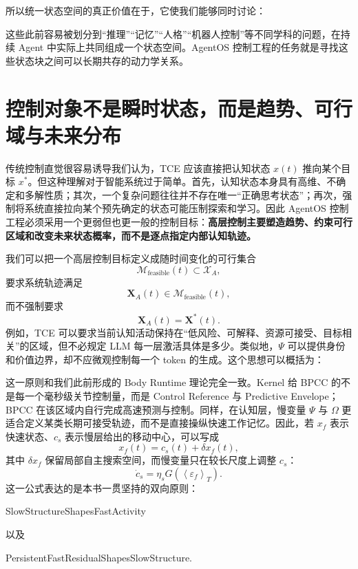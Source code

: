 所以统一状态空间的真正价值在于，它使我们能够同时讨论：
\begin{statementbox}
\centering
{}
\end{statementbox}
这些此前容易被划分到“推理”“记忆”“人格”“机器人控制”等不同学科的问题，在持续 Agent 中实际上共同组成一个状态空间。AgentOS 控制工程的任务就是寻找这些状态块之间可以长期共存的动力学关系。

\section{控制对象不是瞬时状态，而是趋势、可行域与未来分布}

传统控制直觉很容易诱导我们认为，TCE 应该直接把认知状态 $x(t)$ 推向某个目标 $x^\ast$。但这种理解对于智能系统过于简单。首先，认知状态本身具有高维、不确定和多解性质；其次，一个复杂问题往往并不存在唯一“正确思考状态”；再次，强制将系统直接拉向某个预先确定的状态可能压制探索和学习。因此 AgentOS 控制工程必须采用一个更弱但也更一般的控制目标：\textbf{高层控制主要塑造趋势、约束可行区域和改变未来状态概率，而不是逐点指定内部认知轨迹。}

我们可以把一个高层控制目标定义成随时间变化的可行集合
\[
\mathcal M_{\mathrm{feasible}}(t)
\subset
\mathcal X_A,
\]
要求系统轨迹满足
\[
\mathbf X_A(t)\in
\mathcal M_{\mathrm{feasible}}(t),
\]
而不强制要求
\[
\mathbf X_A(t)=\mathbf X^\ast(t).
\]
例如，TCE 可以要求当前认知活动保持在“低风险、可解释、资源可接受、目标相关”的区域，但不必规定 LLM 每一层激活具体是多少。类似地，$\Psi$ 可以提供身份和价值边界，却不应微观控制每一个 token 的生成。这个思想可以概括为：
\begin{statementbox}
\centering
{}
\end{statementbox}

这一原则和我们此前形成的 Body Runtime 理论完全一致。Kernel 给 BPCC 的不是每一个毫秒级关节控制量，而是 Control Reference 与 Predictive Envelope；BPCC 在该区域内自行完成高速预测与控制。同样，在认知层，慢变量 $\Psi$ 与 $\Omega$ 更适合定义某类长期可接受轨迹，而不是直接操纵快速工作记忆。因此，若 $x_f$ 表示快速状态、$c_s$ 表示慢层给出的移动中心，可以写成
\[
x_f(t)
=
c_s(t)
+
\delta x_f(t),
\]
其中 $\delta x_f$ 保留局部自主搜索空间，而慢变量只在较长尺度上调整 $c_s$：
\[
\dot c_s
=
\eta_s
G\left(
\left\langle
\varepsilon_f
\right\rangle_T
\right).
\]
这一公式表达的是本书一贯坚持的双向原则：
\begin{statementbox}
SlowStructureShapesFastActivity
\end{statementbox}
以及
\begin{statementbox}
PersistentFastResidualShapesSlowStructure.
\end{statementbox}

